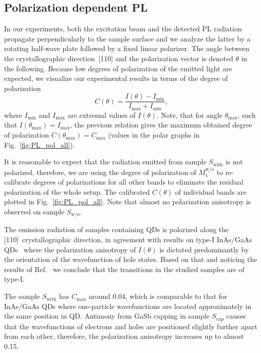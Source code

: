\subsection{Polarization dependent PL }
In our experiments, both the excitation beam and the detected PL radiation propagate perpendicularly to the sample surface and we analyze the latter by a rotating half-wave plate followed by a fixed linear polarizer. The angle between the crystallographic direction~[110] and the polarization vector is denoted $\theta$ in the following. Because low degrees of polarization of the emitted light are expected, we visualize our experimental results in terms of the degree of polarization
%
\begin{equation}
C(\theta)=\frac{I(\theta)-I_\mathrm{min}}{I_\mathrm{max}+I_\mathrm{min}},
\end{equation}
%
where $I_\mathrm{min}$ and $I_\mathrm{max}$ are extremal values of $I(\theta)$. Note, that for angle $\theta_\mathrm{max}$, such that $I(\theta_\mathrm{max})=I_\mathrm{max}$, the previous relation gives the maximum obtained degree of polarization $C(\theta_\mathrm{max})=C_\mathrm{max}$ (values in the polar graphs in Fig.~\ref{fig:PL_pol_all}).

It is reasonable to expect that the radiation emitted from sample ${S_\mathrm{with}}$ is not polarized, therefore, we are using the degree of polarization of $M_1^\mathrm{w/o}$ to re-calibrate degrees of polarizations for all other bands to eliminate the residual polarization of the whole setup. The calibrated $C(\theta)$ of individual bands are plotted in Fig.~\ref{fig:PL_pol_all}. Note that almost no polarization anisotropy is observed on sample ${S_\mathrm{w/o}}$.

The emission radiation of samples containing QDs is polarized along the [110]~crystallographic direction, in agreement with results on type-I InAs/GaAs QDs~\citep{HumPhysE} where the polarization anisotropy of $I(\theta)$ is dictated predominantly by the orientation of the wavefunction of hole states. Based on that and noticing the results of Ref.~\citep{Klenovsky2015} we conclude that the transitions in the studied samples are of type-I.

  The sample ${S_\mathrm{with}}$ has $C_\mathrm{max}$ around 0.04, which is comparable to that for InAs/GaAs QDs where one-particle wavefunctions are located approximately in the same position in QD. Antimony from GaSb capping in sample ${S_\mathrm{cap}}$ causes that the wavefunctions of electrons and holes are positioned slightly further apart from each other, therefore, the polarization anisotropy increases up to almost 0.15.
  
